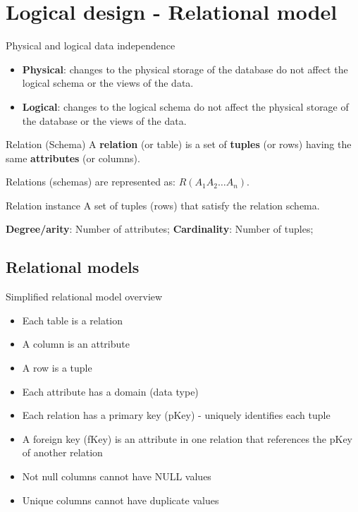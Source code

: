 \section{Logical design - Relational model}

\begin{theorem}
    {Physical and logical data independence}
    \begin{itemize}
        \item \textbf{Physical}: changes to the physical storage of the database do not affect the logical schema or the views of the data.
        \item \textbf{Logical}: changes to the logical schema do not affect the physical storage of the database or the views of the data.
    \end{itemize}
\end{theorem}

\begin{definition}
    {Relation (Schema)}
    A \textbf{relation} (or table) is a set of \textbf{tuples} (or rows) having the same \textbf{attributes} (or columns).

    Relations (schemas) are represented as: $R(A_1A_2 \ldots A_n)$.
\end{definition}

\begin{knBox}
    {Relation instance}
    A set of tuples (rows) that satisfy the relation schema.

    \textbf{Degree/arity}: Number of attributes;
    \textbf{Cardinality}: Number of tuples;
\end{knBox}

\label{sec:relational_model}
\subsection{Relational models}

\begin{definition}
    {Simplified relational model overview}
    \begin{itemize}
        \item Each table is a relation
        \item A column is an attribute
        \item A row is a tuple
        \item Each attribute has a domain (data type)
        \item Each relation has a primary key (pKey) - uniquely identifies each tuple
        \item A foreign key (fKey) is an attribute in one relation that references the pKey of another relation
        \item Not null columns cannot have NULL values
        \item Unique columns cannot have duplicate values
    \end{itemize}
\end{definition}

